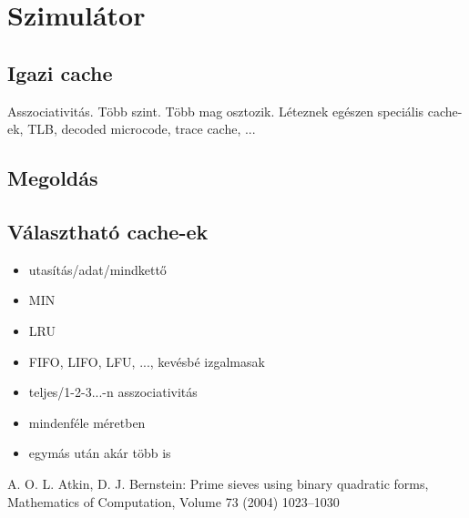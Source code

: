 \documentclass[12pt]{report}
\begin{document}
\chapter{Szimulátor}

\section{Igazi cache}

Asszociativitás. Több szint. Több mag osztozik. Léteznek egészen speciális cache-ek, TLB, decoded microcode, trace cache, ...

\section{Megoldás}

\section{Választható cache-ek}

\begin{itemize}
\item utasítás/adat/mindkettő
\item MIN
\item LRU
\item FIFO, LIFO, LFU, ..., kevésbé izgalmasak
\item teljes/1-2-3...-n asszociativitás
\item mindenféle méretben
\item egymás után akár több is
\end{itemize}

\begin{thebibliography}{9}

A. O. L. Atkin, D. J. Bernstein: Prime sieves using binary quadratic forms, Mathematics of Computation, Volume 73 (2004) 1023–1030

\end{thebibliography}
\end{document}

